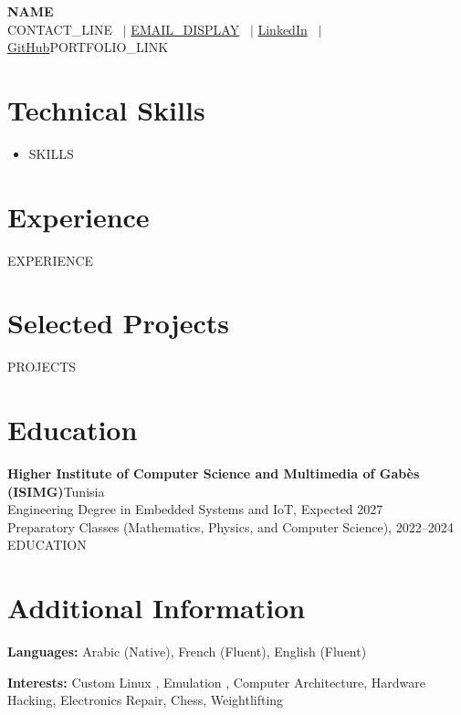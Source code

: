 \documentclass[{{PAPER}},11pt]{article}
\newcommand{\skills}[2]{\noindent\textbf{#1:} {\fontsize{9.6}{11.2}\selectfont #2}\par}
\newcommand{\resumeSubHeadingListStart}{\begin{itemize}[leftmargin=0.0in, label={}]}
\newcommand{\resumeSubHeadingListEnd}{\end{itemize}}
\begin{document}
\begin{center}
  {\LARGE\textbf{{{NAME}}}}\\[-1pt]
  {\small {{CONTACT_LINE}} \ $|$ \href{{{EMAIL_URL}}}{{{EMAIL_DISPLAY}}} \ $|$ \href{{{LINKEDIN_URL}}}{LinkedIn} \ $|$ \href{{{GITHUB_URL}}}{GitHub}{{PORTFOLIO_LINK}}%
  }
\end{center}
\vspace{-16pt}

\section{Technical Skills}
\vspace{-3pt}
\begin{itemize}[leftmargin=0.0in, label={}]\item{
{\fontsize{9.6}{11.2}\selectfont
{{SKILLS}}
}
}\end{itemize}

\section{Experience}
  \resumeSubHeadingListStart
{{EXPERIENCE}}
  \resumeSubHeadingListEnd

\section{Selected Projects}
\resumeSubHeadingListStart
{{PROJECTS}}
\resumeSubHeadingListEnd

\section{Education}
\textbf{Higher Institute of Computer Science and Multimedia of Gabès (ISIMG)}\hfill {\small Tunisia}\\
{\small Engineering Degree in Embedded Systems and IoT, Expected 2027}\\[-1pt]
{\small Preparatory Classes (Mathematics, Physics, and Computer Science), 2022–2024}%
{{EDUCATION}}

\section{Additional Information}
\skills{Languages}{Arabic (Native), French (Fluent), English (Fluent)}
\skills{Interests}{Custom Linux , Emulation , Computer Architecture, Hardware Hacking, Electronics Repair, Chess, Weightlifting}

\end{document}
